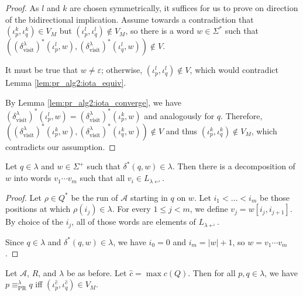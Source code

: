 \begin{proof}
	As $l$ and $k$ are chosen symmetrically, it suffices for us to prove on direction of the bidirectional implication. Assume towards a contradiction that $(\iota_p^k, \iota_q^k) \in V_M$ but $(\iota_p^l, \iota_q^l) \notin V_M$, so there is a word $w \in \Sigma^*$ such that $((\delta^\lambda_\text{visit})^*(\iota_p^l, w), (\delta^\lambda_\text{visit})^*(\iota_q^l, w)) \notin V$.
	
	It must be true that $w \neq \varepsilon$; otherwise, $(\iota_p^l, \iota_q^l) \notin V$, which would contradict Lemma \ref{lem:pr_alg2:iota_equiv}.
	
	By Lemma \ref{lem:pr_alg2:iota_converge}, we have $(\delta^\lambda_\text{visit})^*(\iota_p^l, w) = (\delta^\lambda_\text{visit})^*(\iota_p^k, w)$ and analogously for $q$. Therefore, $((\delta^\lambda_\text{visit})^*(\iota_p^k, w), (\delta^\lambda_\text{visit})^*(\iota_q^k, w)) \notin V$ and thus $(\iota_p^k, \iota_q^k) \notin V_M$, which contradicts our assumption.
\end{proof}

\begin{lem}
	Let $q \in \lambda$ and $w \in \Sigma^+$ such that $\delta^*(q, w) \in \lambda$. Then there is a decomposition of $w$ into words $v_1 \cdots v_m$ such that all $v_i \in L_{\lambda \hookleftarrow}$.
	\label{lem:pr_alg2:decompose_lambdahook}
\end{lem}

\begin{proof}
	Let $\rho \in Q^*$ be the run of $\mathcal{A}$ starting in $q$ on $w$. Let $i_1 < \dots < i_m$ be those positions at which $\rho(i_j) \in \lambda$. For every $1 \leq j < m$, we define $v_j = w[i_j, i_{j+1}]$. By choice of the $i_j$, all of those words are elements of $L_{\lambda \hookleftarrow}$.
	
	Since $q \in \lambda$ and $\delta^*(q, w) \in \lambda$, we have $i_0 = 0$ and $i_m = |w| + 1$, so $w = v_1 \cdots v_m$.  
\end{proof}

\begin{theorem}
	Let $\mathcal{A}$, $R$, and $\lambda$ be as before. Let $\hat{c} = \max c(Q)$. Then for all $p, q \in \lambda$, we have $p \equiv_\text{PR}^\lambda q$ iff $(\iota_p^{\hat{c}}, \iota_q^{\hat{c}}) \in V_M$.
\end{theorem}

